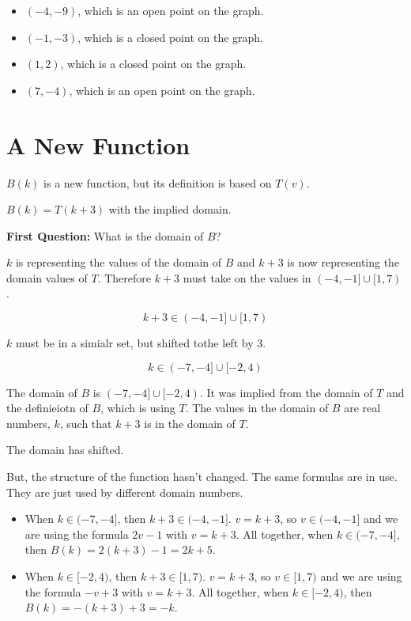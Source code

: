 \documentclass{ximera}
\begin{document}
\begin{itemize}

\item $(-4, -9)$, which is an open point on the graph.
\item $(-1, -3)$, which is a closed point on the graph.
\item $(1, 2)$, which is a closed point on the graph.
\item $(7, -4)$, which is an open point on the graph.

\end{itemize}




\section{A New Function}

$B(k)$ is a new function, but its definition is based on $T(v)$.


$B(k) = T(k+3)$ with the implied domain.


\textbf{First Question:} What is the domain of $B$?

$k$ is representing the values of the domain of $B$ and $k+3$ is now representing the domain values of $T$.  Therefore $k+3$ must take on the values in $(-4,-1] \cup [1,7)$.

\[     k+3 \in      (-4,-1] \cup [1,7)     \]


$k$ must be in a simialr set, but shifted tothe left by $3$.


\[     k \in      (-7,-4] \cup [-2,4)     \]


The domain of $B$ is $(-7,-4] \cup [-2,4)$.   It was implied from the domain of $T$ and the definieiotn of $B$, which is using $T$.  The values in the domain of $B$ are real numbers, $k$, such that $k+3$ is in the domain of $T$.

The domain has shifted. 


But, the structure of the function hasn't changed.  The same formulas are in use.  They are just used by different domain numbers.



\begin{itemize}

\item When $k \in (-7,-4]$, then $k+3 \in (-4,-1]$.  $v=k+3$, so $v \in (-4,-1]$ and we are using the formula $2v-1$ with $v=k+3$.
All together, when $k \in (-7,-4]$, then $B(k) = 2(k+3)-1 = 2k+5$.

\item When $k \in [-2,4)$, then $k+3 \in [1,7)$.  $v=k+3$, so $v \in [1,7)$ and we are using the formula $-v+3$ with $v=k+3$.
All together, when $k \in [-2,4)$, then $B(k) = -(k+3)+3 = -k$.


\end{itemize}
\end{document}
